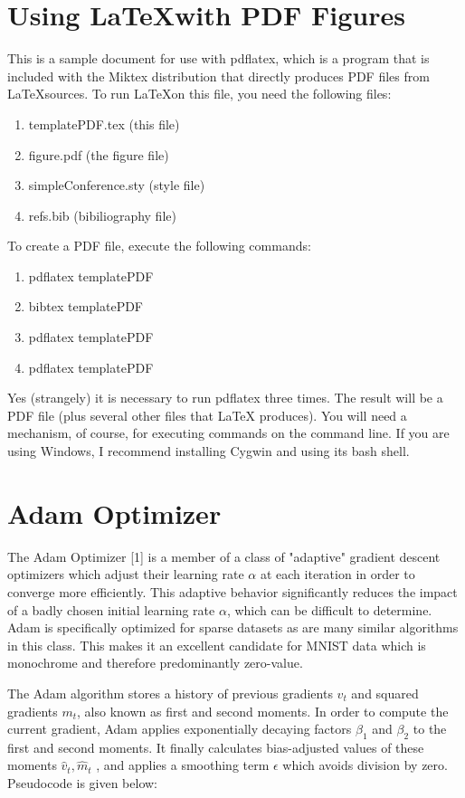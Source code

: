 \documentclass[10pt,twocolumn]{article}
\begin{document}
\section{Using \LaTeX with PDF Figures}

This is a sample document for use with pdflatex, which is
a program that is included with the Miktex distribution
that directly produces PDF files from \LaTeX sources.
To run \LaTeX on this file, you need the following files:
\begin{enumerate}
\item templatePDF.tex (this file)
\item figure.pdf (the figure file)
\item simpleConference.sty (style file)
\item refs.bib (bibiliography file)
\end{enumerate}
\noindent
To create a PDF file, execute the following commands:
\begin{enumerate}
\item pdflatex templatePDF
\item bibtex templatePDF
\item pdflatex templatePDF
\item pdflatex templatePDF
\end{enumerate}
\noindent
Yes (strangely) it is necessary to run pdflatex three times.
The result will be a PDF file (plus several other files that \LaTeX
produces).  You will need a mechanism, of course, for executing
commands on the command line. If you are using Windows, I recommend
installing Cygwin and using its bash shell.

\section{Adam Optimizer}


The Adam Optimizer [1] is a member of a class of "adaptive" gradient descent optimizers which adjust their learning rate $\alpha$ at each iteration in order to converge more efficiently. This adaptive behavior significantly reduces the impact of a badly chosen initial learning rate $\alpha$, which can be difficult to determine. Adam is specifically optimized for sparse datasets as are many similar algorithms in this class. This makes it an excellent candidate for MNIST data which is monochrome and therefore predominantly zero-value. 

The Adam algorithm stores a history of previous gradients $v_t$ and squared gradients $m_t$, also known as first and second moments. In order to compute the current gradient, Adam applies exponentially decaying factors $ \beta_1$ and $\beta_2$ to the first and second moments. It finally calculates bias-adjusted values of these moments $\hat{v}_t , \hat{m}_t $ , and applies a smoothing term $\epsilon$ which avoids division by zero. Pseudocode is given below:
\end{document}
